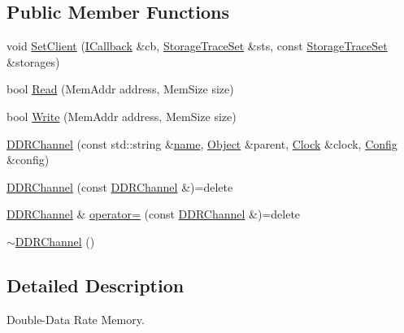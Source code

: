 \subsection*{Public Member Functions}
\begin{DoxyCompactItemize}
\item 
void \hyperlink{class_simulator_1_1_d_d_r_channel_a28fdeeb9ee0a0cd45284f60caf697500}{Set\+Client} (\hyperlink{class_simulator_1_1_d_d_r_channel_1_1_i_callback}{I\+Callback} \&cb, \hyperlink{class_simulator_1_1_storage_trace_set}{Storage\+Trace\+Set} \&sts, const \hyperlink{class_simulator_1_1_storage_trace_set}{Storage\+Trace\+Set} \&storages)
\item 
bool \hyperlink{class_simulator_1_1_d_d_r_channel_a98cb4b191579e38a55d7f2fa151d506e}{Read} (Mem\+Addr address, Mem\+Size size)
\item 
bool \hyperlink{class_simulator_1_1_d_d_r_channel_a9e9ac679badb89117777eab0c995b6a8}{Write} (Mem\+Addr address, Mem\+Size size)
\item 
\hyperlink{class_simulator_1_1_d_d_r_channel_a3b5be35a15d75db4599d9975dcbddf56}{D\+D\+R\+Channel} (const std\+::string \&\hyperlink{mtconf_8c_a8f8f80d37794cde9472343e4487ba3eb}{name}, \hyperlink{class_simulator_1_1_object}{Object} \&parent, \hyperlink{class_simulator_1_1_clock}{Clock} \&clock, \hyperlink{class_config}{Config} \&config)
\item 
\hyperlink{class_simulator_1_1_d_d_r_channel_afdc22f216e992c503d08f2a5fadde703}{D\+D\+R\+Channel} (const \hyperlink{class_simulator_1_1_d_d_r_channel}{D\+D\+R\+Channel} \&)=delete
\item 
\hyperlink{class_simulator_1_1_d_d_r_channel}{D\+D\+R\+Channel} \& \hyperlink{class_simulator_1_1_d_d_r_channel_a482cd16d9b4290f53ad8e035aa042f8e}{operator=} (const \hyperlink{class_simulator_1_1_d_d_r_channel}{D\+D\+R\+Channel} \&)=delete
\item 
\hyperlink{class_simulator_1_1_d_d_r_channel_a3f2fb176c7188dd1bf0969d4cb173aac}{$\sim$\+D\+D\+R\+Channel} ()
\end{DoxyCompactItemize}


\subsection{Detailed Description}
Double-\/\+Data Rate Memory. 

